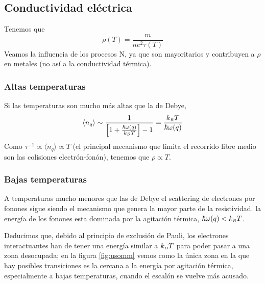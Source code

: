 \subsection{Conductividad eléctrica}

Tenemos que
\begin{equation}
  \rho (T) = \frac{m}{n e^2 \tau(T)}
\end{equation}
Veamos la influencia de los procesos N, ya que son mayoritarios y
contribuyen a $\rho$ en metales (no así a la conductividad térmica).

\subsubsection{Altas temperaturas}
Si las temperaturas son mucho más altas que la de Debye,
\begin{equation}
  \langle n_q \rangle \sim \frac{1}{\left[ 1 + \frac{\hbar
        \omega(q)}{k_{\scriptscriptstyle{B}}  T} \right] - 1} = \frac{k_{\scriptscriptstyle{B}}  T}{\hbar\omega(q)}
\end{equation}
Como $\tau ^{-1} \propto \langle n_q\rangle \propto T$ (el principal
mecanismo que limita el recorrido libre medio son las colisiones
electrón-fonón), tenemos que $\rho \propto T$.



\subsubsection{Bajas temperaturas}
\label{subsubsec:lowtempelectron}
A temperaturas mucho menores que las de Debye el scattering de
electrones por fonones sigue siendo el mecanismo que genera la mayor parte de la
resistividad. la energía de los fonones esta dominada por la agitación térmica, $\hbar \omega(q) <
k_{\scriptscriptstyle{B}} T$.

Deducimos que, debido al principio de exclusión de Pauli, los electrones interactuantes han
de tener una energía similar a $k_{\scriptscriptstyle{B}}  T$ para poder pasar a una zona
desocupada; en la figura \ref{fig:usomm} vemos como la única zona en la que hay
posibles transiciones es la cercana a la energía por agitación
térmica, especialmente a bajas temperaturas, cuando el escalón se
vuelve más acusado.

